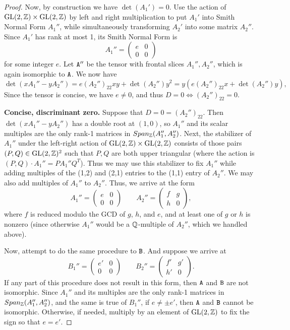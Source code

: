 \begin{proof}
Now, by construction we have $\det(A_1') = 0$. Use the action of $\mathrm{GL}(2,\mathbb{Z}) \times \mathrm{GL}(2,\mathbb{Z})$ by left and right multiplication to put $A_1'$ into Smith Normal Form $A_1''$, while simultaneously transforming $A_2'$ into some matrix $A_2''$. Since $A_1'$ has rank at most 1, its Smith Normal Form is 
\[
A_1'' = \begin{pmatrix} e & 0 \\ 0 & 0 \end{pmatrix}
\]
for some integer $e$.
Let $\mathtt{A}''$ be the tensor with frontal slices $A_1'', A_2''$, which is again isomorphic to $\mathtt{A}$. We now have
\[
\det(x A_1'' - y A_2'') = e (A_2'')_{22} xy + \det(A_2'') y^2 = y(e (A_2'')_{22}  x + \det(A_2'') y),
\]
Since the tensor is concise, we have $e \neq 0$, and thus $D = 0 \Leftrightarrow (A_2'')_{22} = 0$. 


\textbf{Concise, discriminant zero.} Suppose that $D = 0 = (A_2'')_{22}$.  Then $\det(x A_1'' - y A_2'')$ has a double root at $(1,0)$, so $A_1''$ and its scalar multiples are the only rank-1 matrices in $Span_{\mathbb{Z}}(A_1'', A_2'')$. Next, the stabilizer of $A_1''$ under the left-right action of $\mathrm{GL}(2,\mathbb{Z}) \times \mathrm{GL}(2,\mathbb{Z})$ consists of those pairs $(P,Q) \in \mathrm{GL}(2,\mathbb{Z})^2$ such that $P,Q$ are both upper triangular (where the action is $(P,Q) \cdot A_1'' = P A_1'' Q^T$). Thus we may use this stabilizer to fix $A_1''$ while adding multiples of the (1,2) and (2,1) entries to the (1,1) entry of $A_2''$. We may also add multiples of $A_1''$ to $A_2''$. Thus, we arrive at the form
\[
A_1'' = \begin{pmatrix} e & 0 \\ 0 & 0 \end{pmatrix} \qquad A_2'' = \begin{pmatrix} f & g \\ h & 0 \end{pmatrix},
\]
where $f$ is reduced modulo the GCD of $g$, $h$, and $e$, and at least one of $g$ or $h$ is nonzero (since otherwise $A_1''$ would be a $\mathbb{Q}$-multiple of $A_2''$, which we handled above).

Now, attempt to do the same procedure to $\mathtt{B}$. And suppose we arrive at 
\[
B_1'' = \begin{pmatrix} e' & 0 \\ 0 & 0 \end{pmatrix} \qquad B_2'' = \begin{pmatrix} f' & g' \\ h' & 0 \end{pmatrix}.
\]
If any part of this procedure does not result in this form, then $\mathtt{A}$ and $\mathtt{B}$ are not isomorphic. Since $A_1''$ and its multiples are the only rank-1 matrices in $Span_{\mathbb{Z}}(A_1'', A_2'')$, and the same is true of $B_1''$, if $e \neq \pm e'$, then $\mathtt{A}$ and $\mathtt{B}$ cannot be isomorphic. Otherwise, if needed, multiply by an element of $\mathrm{GL}(2,\mathbb{Z})$ to fix the sign so that $e = e'$. 


\end{proof}
